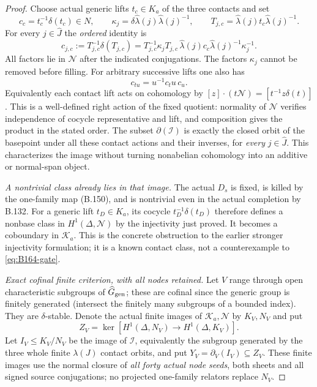\begin{proof}
Choose actual generic lifts $t_c\in K_a$ of the three contacts and set
\[
 c_c=t_c^{-1}\delta(t_c)\in N,\qquad
 \kappa_j=\delta\widehat\lambda(j)\widehat\lambda(j)^{-1},\qquad
 T_{j,c}=\widehat\lambda(j)t_c\widehat\lambda(j)^{-1}.
\]
For every $j\in\widehat J$ the \emph{ordered} identity is
\begin{equation}\label{eq:B164-contact}
 c_{j,c}:=T_{j,c}^{-1}\delta(T_{j,c})
 =T_{j,c}^{-1}\kappa_jT_{j,c}\,
       \widehat\lambda(j)c_c\widehat\lambda(j)^{-1}\kappa_j^{-1}.
\end{equation}
All factors lie in $\mathcal N$ after the indicated conjugations.
The factors $\kappa_j$ cannot be removed before filling. For arbitrary
successive lifts one also has
\[
 c_{tu}=u^{-1}c_tu\,c_u.
\]
Equivalently each contact lift acts on cohomology by
$[z]\cdot(t\mathcal N)=[t^{-1}z\delta(t)]$.
This is a well-defined right action of the fixed quotient: normality
of $\mathcal N$ verifies independence of cocycle representative and
lift, and composition gives the product in the stated order.
The subset $\partial(\mathcal I)$ is exactly the closed orbit of the
basepoint under all these contact actions and their inverses, for
\emph{every} $j\in\widehat J$. This characterizes the image without
turning nonabelian cohomology into an additive or normal-span object.

\emph{A nontrivial class already lies in that image.}
The actual $D_s$ is fixed, is killed by the one-family map (B.150),
and is nontrivial even in the actual completion by B.132. For a generic
lift $t_D\in K_a$, its cocycle $t_D^{-1}\delta(t_D)$ therefore defines
a nonbase class in $H^1(\Delta,\mathcal N)$ by the injectivity just
proved. It becomes a coboundary in $\mathcal K_a$. This is the concrete
obstruction to the earlier stronger injectivity formulation; it is a
known contact class, not a counterexample to \eqref{eq:B164-gate}.

\emph{Exact cofinal finite criterion, with all nodes retained.}
Let $V$ range through open characteristic subgroups of
$\widehat G_{\rm gen}$; these are cofinal since the generic group is
finitely generated (intersect the finitely many subgroups of a bounded
index). They are $\delta$-stable. Denote the actual finite images of
$\mathcal K_a,\mathcal N$ by $K_V,N_V$ and put
\[
 Z_V=\ker[H^1(\Delta,N_V)\to H^1(\Delta,K_V)].
\]
Let $I_V\le K_V/N_V$ be the image of $\mathcal I$, equivalently the
subgroup generated by the three whole finite $\lambda(J)$ contact
orbits, and put $Y_V=\partial_V(I_V)\subseteq Z_V$.
These finite images use the normal closure of \emph{all forty actual
node seeds}, both sheets and all signed source conjugations; no
projected one-family relators replace $N_V$.


\end{proof}

